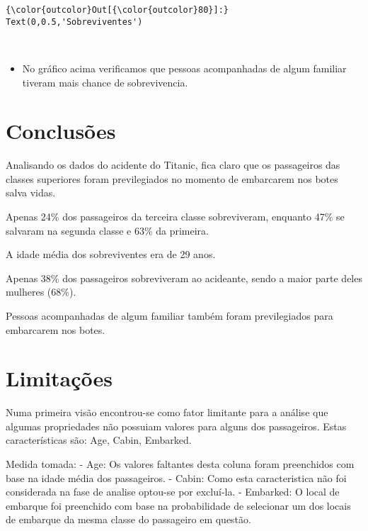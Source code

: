 \documentclass[11pt]{article}
\providecommand{\tightlist}{%
      \setlength{\itemsep}{0pt}\setlength{\parskip}{0pt}}
\begin{document}
\begin{Verbatim}[commandchars=\\\{\}]
{\color{outcolor}Out[{\color{outcolor}80}]:} Text(0,0.5,'Sobreviventes')
\end{Verbatim}
            
    \begin{center}
    \end{center}
    { \hspace*{\fill} \\}
    
    \begin{itemize}
\tightlist
\item
  No gráfico acima verificamos que pessoas acompanhadas de algum
  familiar tiveram mais chance de sobrevivencia.
\end{itemize}

    \section{Conclusões}\label{conclusuxf5es}

Analisando os dados do acidente do Titanic, fica claro que os
passageiros das classes superiores foram previlegiados no momento de
embarcarem nos botes salva vidas.

Apenas 24\% dos passageiros da terceira classe sobreviveram, enquanto
47\% se salvaram na segunda classe e 63\% da primeira.

A idade média dos sobreviventes era de 29 anos.

Apenas 38\% dos passageiros sobreviveram ao acideante, sendo a maior
parte deles mulheres (68\%).

Pessoas acompanhadas de algum familiar também foram previlegiados para
embarcarem nos botes.

    \section{Limitações}\label{limitauxe7uxf5es}

Numa primeira visão encontrou-se como fator limitante para a análise que
algumas propriedades não possuiam valores para alguns dos passageiros.
Estas características são: Age, Cabin, Embarked.

Medida tomada: - Age: Os valores faltantes desta coluna foram
preenchidos com base na idade média dos passageiros. - Cabin: Como esta
caracteristica não foi considerada na fase de analise optou-se por
excluí-la. - Embarked: O local de embarque foi preenchido com base na
probabilidade de selecionar um dos locais de embarque da mesma classe do
passageiro em questão.
\end{document}
